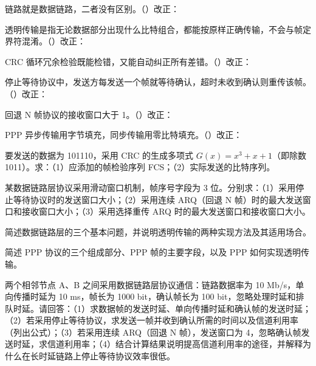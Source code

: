 \documentclass[a4paper,11pt]{article}
\begin{document}
\q 链路就是数据链路，二者没有区别。\quad（\quad）\quad 改正：\fixblank

\q 透明传输是指无论数据部分出现什么比特组合，都能按原样正确传输，不会与帧定界符混淆。\quad（\quad）\quad 改正：\fixblank

\q CRC 循环冗余检验既能检错，又能自动纠正所有差错。\quad（\quad）\quad 改正：\fixblank

\q 停止等待协议中，发送方每发送一个帧就等待确认，超时未收到确认则重传该帧。\quad（\quad）\quad 改正：\fixblank

\q 回退 N 帧协议的接收窗口大于 1。\quad（\quad）\quad 改正：\fixblank

\q PPP 异步传输用字节填充，同步传输用零比特填充。\quad（\quad）\quad 改正：\fixblank

\q 要发送的数据为 101110，采用 CRC 的生成多项式 $G(x)=x^3+x+1$（即除数 1011）。求：（1）应添加的帧检验序列 FCS；（2）实际发送的比特序列。

\q 某数据链路层协议采用滑动窗口机制，帧序号字段为 3 位。分别求：（1）采用停止等待协议时的发送窗口大小；（2）采用连续 ARQ（回退 N 帧）时的最大发送窗口和接收窗口大小；（3）采用选择重传 ARQ 时的最大发送窗口和接收窗口大小。

\q 简述数据链路层的三个基本问题，并说明透明传输的两种实现方法及其适用场合。\anslines{2.4cm}

\q 简述 PPP 协议的三个组成部分、PPP 帧的主要字段，以及 PPP 如何实现透明传输。\anslines{2.4cm}

\newpage
{}
\q 两个相邻节点 A、B 之间采用数据链路层协议通信：链路数据率为 10 Mb/s，单向传播时延为 10 ms，帧长为 1000 bit，确认帧长为 100 bit，忽略处理时延和排队时延。请回答：（1）求数据帧的发送时延、单向传播时延和确认帧的发送时延；（2）若采用停止等待协议，求发送一帧并收到确认所需的时间以及信道利用率（列出公式）；（3）若采用连续 ARQ（回退 N 帧），发送窗口为 4，忽略确认帧发送时延，求信道利用率；（4）结合计算结果说明提高信道利用率的途径，并解释为什么在长时延链路上停止等待协议效率很低。\anslines{5cm}
\end{document}
